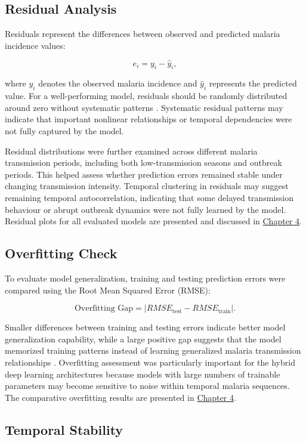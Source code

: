 \subsection{Residual Analysis}

Residuals represent the differences between observed and predicted malaria incidence values:

\[
e_i = y_i - \hat{y}_i,
\]

where \(y_i\) denotes the observed malaria incidence and \(\hat{y}_i\) represents the predicted value. For a well-performing model, residuals should be randomly distributed around zero without systematic patterns \cite{Hastie2009}. Systematic residual patterns may indicate that important nonlinear relationships or temporal dependencies were not fully captured by the model.

Residual distributions were further examined across different malaria transmission periods, including both low-transmission seasons and outbreak periods. This helped assess whether prediction errors remained stable under changing transmission intensity. Temporal clustering in residuals may suggest remaining temporal autocorrelation, indicating that some delayed transmission behaviour or abrupt outbreak dynamics were not fully learned by the model. Residual plots for all evaluated models are presented and discussed in \hyperref[ch:results]{Chapter 4}.

\subsection{Overfitting Check}

To evaluate model generalization, training and testing prediction errors were compared using the Root Mean Squared Error (RMSE):

\[
\text{Overfitting Gap} = |RMSE_{\text{test}} - RMSE_{\text{train}}|.
\]

Smaller differences between training and testing errors indicate better model generalization capability, while a large positive gap suggests that the model memorized training patterns instead of learning generalized malaria transmission relationships \cite{Hastie2009}. Overfitting assessment was particularly important for the hybrid deep learning architectures because models with large numbers of trainable parameters may become sensitive to noise within temporal malaria sequences. The comparative overfitting results are presented in \hyperref[ch:results]{Chapter 4}.

\subsection{Temporal Stability}


